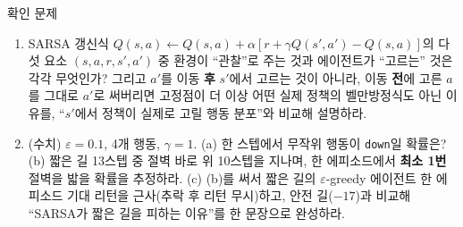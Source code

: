 \begin{frame}{확인 문제}
  \small
  \begin{enumerate}
    \item SARSA 갱신식 $Q(s,a) \leftarrow Q(s,a) + \alpha[r +
      \gamma Q(s',a') - Q(s,a)]$의 다섯 요소 $(s,a,r,s',a')$ 중
      환경이 ``관찰''로 주는 것과 에이전트가 ``고르는'' 것은 각각
      무엇인가? 그리고 $a'$를 이동 \textbf{후} $s'$에서 고르는 것이
      아니라, 이동 \textbf{전}에 고른 $a$를 그대로 $a'$로 써버리면
      고정점이 더 이상 어떤 실제 정책의 벨만방정식도 아닌 이유를,
      ``$s'$에서 정책이 실제로 고릴 행동 분포''와 비교해 설명하라.
    \item (수치) $\varepsilon=0.1$, 4개 행동, $\gamma=1$.
      (a) 한 스텝에서 무작위 행동이 \texttt{down}일 확률은?
      (b) 짧은 길 13스텝 중 절벽 바로 위 10스텝을 지나며, 한 에피소드에서
      \textbf{최소 1번} 절벽을 밟을 확률을 추정하라.
      (c) (b)를 써서 짧은 길의 $\varepsilon$-greedy 에이전트 한 에피소드
      기대 리턴을 근사(추락 후 리턴 무시)하고, 안전 길($-17$)과 비교해
      ``SARSA가 짧은 길을 피하는 이유''를 한 문장으로 완성하라.
  \end{enumerate}
\end{frame}
